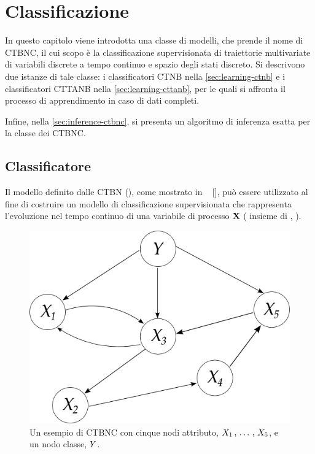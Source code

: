 
\chapter{Classificazione}
\label{cap:ctbnc}
In questo capitolo viene introdotta una classe di modelli, che prende il nome di \acf{CTBNC}, il cui scopo è la classificazione supervisionata di traiettorie multivariate di variabili discrete a tempo continuo e spazio degli stati discreto. Si descrivono due istanze di tale classe: i classificatori \acf{CTNB} nella \autoref{sec:learning-ctnb} e i classificatori \acf{CTTANB} nella \autoref{sec:learning-cttanb}, per le quali si affronta il processo di apprendimento in caso di dati completi.

Infine, nella \autoref{sec:inference-ctbnc}, si presenta un algoritmo di inferenza esatta per la classe dei \acs{CTBNC}.

\section{Classificatore}\label{sec:ctbnc}
Il modello definito dalle \acl{CTBN} (), come mostrato in ~\citeauthor{Stella2012} [\citeyear{Stella2012}], può essere utilizzato al fine di costruire un modello di classificazione supervisionata che rappresenta l'evoluzione nel tempo continuo di una variabile di processo $\mathbf{X}$ (\ie{} insieme di \mprocess{}, ).

\begin{figure}
\centering
\includegraphics[width=0.9\columnwidth]{immagini/ctbnc}
\caption[Un esempio di \acs{CTBNC}]{Un esempio di \acl{CTBNC} con cinque nodi attributo, $\mathnormal{X}_1\,,\,\dotsc\,,\,\mathnormal{X}_5$, e un nodo classe, $\mathnormal{Y}$.}
\label{fig:ctbnc-example}
\end{figure}

